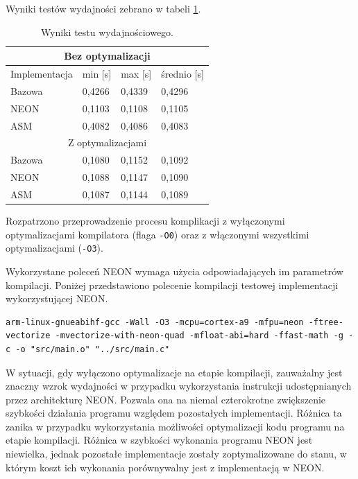Wyniki testów wydajności zebrano w tabeli \ref{tab:neon-time-results}.

\begin{table}[h]
	\caption{Wyniki testu wydajnościowego.}
	\centering
	\label{tab:neon-time-results}
	\begin{tabular}{|l|l|l|l|}
		\hline
		\multicolumn{4}{|c|}{Bez optymalizacji} \\ \hline
		Implementacja & min {[}s{]} & max {[}s{]} & średnio {[}s{]} \\ \hline
		Bazowa & 0,4266 & 0,4339 & 0,4296 \\ \hline
		NEON & 0,1103 & 0,1108 & 0,1105 \\ \hline
		ASM & 0,4082 & 0,4086 & 0,4083 \\ \hline
		\multicolumn{4}{|c|}{Z optymalizacjami} \\ \hline
		Bazowa & 0,1080 & 0,1152 & 0,1092 \\ \hline
		NEON & 0,1088 & 0,1147 & 0,1090 \\ \hline
		ASM & 0,1087 & 0,1144 & 0,1089 \\ \hline
	\end{tabular}
\end{table}

Rozpatrzono przeprowadzenie procesu komplikacji z wyłączonymi optymalizacjami kompilatora (flaga \texttt{-O0}) oraz z włączonymi wszystkimi optymalizacjami (\texttt{-O3}).

Wykorzystane poleceń NEON wymaga użycia odpowiadających im parametrów kompilacji. Poniżej przedstawiono polecenie kompilacji testowej implementacji wykorzystującej NEON.

\begin{lstlisting}[breaklines]
arm-linux-gnueabihf-gcc -Wall -O3 -mcpu=cortex-a9 -mfpu=neon -ftree-vectorize -mvectorize-with-neon-quad -mfloat-abi=hard -ffast-math -g -c -o "src/main.o" "../src/main.c"
\end{lstlisting}

W sytuacji, gdy wyłączono optymalizacje na etapie kompilacji, zauważalny jest znaczny wzrok wydajności w przypadku wykorzystania instrukcji udostępnianych przez architekturę NEON. Pozwala ona na niemal czterokrotne zwiększenie szybkości działania programu względem pozostałych implementacji. Różnica ta zanika w przypadku wykorzystania możliwości optymalizacji kodu programu na etapie kompilacji. Różnica w szybkości wykonania programu NEON jest niewielka, jednak pozostałe implementacje zostały zoptymalizowane do stanu, w którym koszt ich wykonania porównywalny jest z implementacją w NEON.

